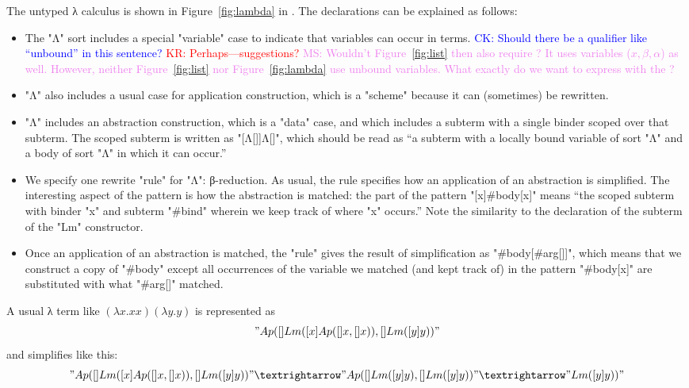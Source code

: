 \documentclass[letterpaper,11pt]{article}
\newcommand{\CK}[1]{\textcolor{blue}{CK: #1}}
\newcommand{\KR}[1]{\textcolor{red}{KR: #1}}
\newcommand{\MS}[1]{\textcolor{violet}{MS: #1}}
\begin{document}
\begin{example}\label{ex:lambda}
  The untyped λ calculus is shown in Figure~\ref{fig:lambda} in \hax.  The declarations can be
  explained as follows:
  \begin{itemize}

  \item The "Λ" sort includes a special "variable" case to indicate that variables can occur in
    terms. \CK{Should there be a qualifier like ``unbound'' in this sentence?}
    \KR{Perhaps---suggestions?} \MS{Wouldn't Figure~\ref{fig:list} then also require \kw{variable}?
      It uses variables ($x, \beta, \alpha$) as well. However, neither Figure~\ref{fig:list} nor
      Figure~\ref{fig:lambda} use unbound variables. What exactly do we want to express with the
      \kw{variable}?}

  \item "Λ" also includes a usual case for application construction, which is a "scheme" because it
    can (sometimes) be rewritten.

  \item "Λ" includes an abstraction construction, which is a "data" case, and which includes a
    subterm with a single binder scoped over that subterm. The scoped subterm is written as
    "[Λ[]]Λ[]", which should be read as ``a subterm with a locally bound variable of sort "Λ" and a
    body of sort "Λ" in which it can occur.''

  \item We specify one rewrite "rule" for "Λ": β-reduction. As usual, the rule specifies how an
    application of an abstraction is simplified. The interesting aspect of the pattern is how the
    abstraction is matched: the part of the pattern "[x]#body[x]" means ``the scoped subterm with
    binder "x" and subterm "#bind" wherein we keep track of where "x" occurs.'' Note the similarity
    to the declaration of the subterm of the "Lm" constructor.

  \item Once an application of an abstraction is matched, the "rule" gives the result of
    simplification as "#body[#arg[]]", which means that we construct a copy of "#body" except all
    occurrences of the variable we matched (and kept track of) in the pattern "#body[x]" are
    substituted with what "#arg[]" matched.

  \end{itemize}
  A usual λ term like $(λx.x x)(λy.y)$ is represented as
  \begin{displaymath}
    "Ap([]Lm([x]Ap([]x, []x)), []Lm([y]y))"    
  \end{displaymath}
  and simplifies like this:
  \begin{displaymath}
    "Ap([]Lm([x]Ap([]x, []x)), []Lm([y]y))" →
    "Ap([]Lm([y]y), []Lm([y]y))" →
    "Lm([y]y))"
  \end{displaymath}
\end{example}
\end{document}
